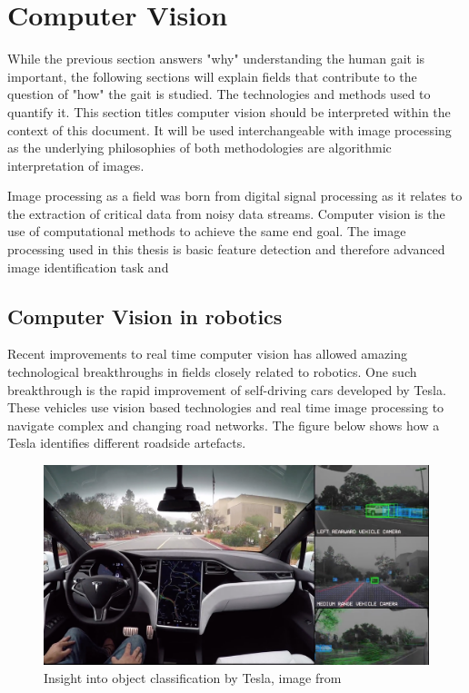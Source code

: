 \section{Computer Vision}
While the previous section answers "why" understanding the human gait is important, the following sections will explain fields that contribute to the question of "how" the gait is studied. The technologies and methods used to quantify it. This section titles computer vision should be interpreted within the context of this document. It will be used interchangeable with image processing as the underlying philosophies of both methodologies are algorithmic interpretation of images.

Image processing as a field was born from digital signal processing as it relates to the extraction of critical data from noisy data streams. Computer vision is the use of computational methods to achieve the same end goal. The image processing used in this thesis is basic feature detection and therefore advanced image identification task and   







\subsection{Computer Vision in robotics}
Recent improvements to real time computer vision has allowed amazing technological breakthroughs in fields closely related to robotics. One such breakthrough is the rapid improvement of self-driving cars developed by Tesla. These vehicles use vision based technologies and real time image processing to navigate complex and changing road networks. The figure below shows how a Tesla identifies different roadside artefacts.

\begin{figure}[!ht] 
\captionsetup{width=0.8\linewidth, font=small}  
\includegraphics[width=0.8\linewidth]{figures/teslaauto.jpg}
\caption{Insight into object classification by Tesla, image from 	\cite{tesla}}
\label{fig:teslaauto}
\end{figure}





